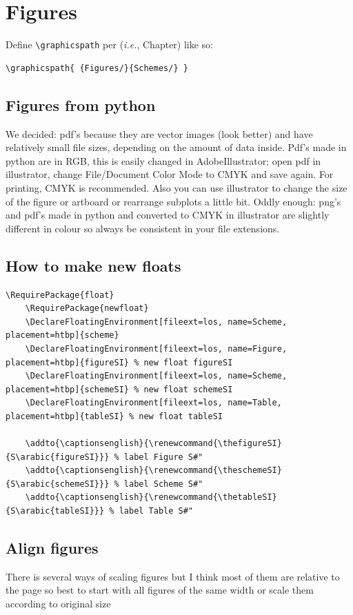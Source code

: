 \documentclass[main_brownies.tex]{subfiles}
\begin{document}
\section{Figures}
Define \verb*|\graphicspath| per \verb*|| (\textit{i.e.}, Chapter) like so:\cite{GraphicsPathSubfiles}
\begin{Verbatim}[breaklines=true, breakanywhere=true]
	\graphicspath{ {Figures/}{Schemes/} }
\end{Verbatim}

\subsection{Figures from python}
We decided: pdf's because they are vector images (look better) and have relatively small file sizes, depending on the amount of data inside. Pdf's made in python are in RGB, this is easily changed in AdobeIllustrator: open pdf in illustrator, change File/Document Color Mode to CMYK and save again. For printing, CMYK is recommended. Also you can use illustrator to change the size of the figure or artboard or rearrange subplots a little bit. Oddly enough: png's and pdf's made in python and converted to CMYK in illustrator are slightly different in colour so always be consistent in your file extensions. 

\subsection{How to make new floats}
\begin{Verbatim}[breaklines=true, breakanywhere=true]
	\RequirePackage{float}
	\RequirePackage{newfloat}
	\DeclareFloatingEnvironment[fileext=los, name=Scheme, placement=htbp]{scheme}
	\DeclareFloatingEnvironment[fileext=los, name=Figure, placement=htbp]{figureSI} % new float figureSI
	\DeclareFloatingEnvironment[fileext=los, name=Scheme, placement=htbp]{schemeSI} % new float schemeSI
	\DeclareFloatingEnvironment[fileext=los, name=Table, placement=htbp]{tableSI} % new float tableSI
	
	\addto{\captionsenglish}{\renewcommand{\thefigureSI}{S\arabic{figureSI}}} % label Figure S#"
	\addto{\captionsenglish}{\renewcommand{\theschemeSI}{S\arabic{schemeSI}}} % label Scheme S#"
	\addto{\captionsenglish}{\renewcommand{\thetableSI}{S\arabic{tableSI}}} % label Table S#"
\end{Verbatim}

\subsection{Align figures}
There is several ways of scaling figures but I think most of them are relative to the page so best to start with all figures of the same width or scale them according to original size
\end{document}
